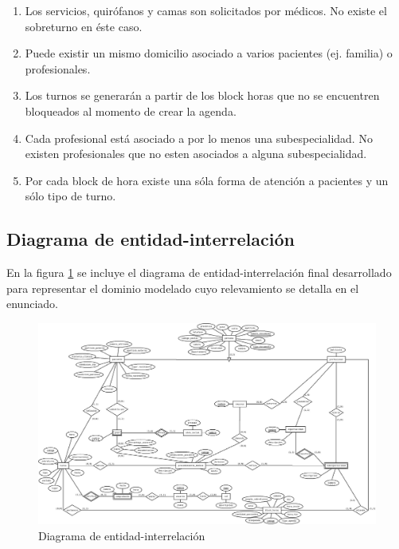 \documentclass[a4paper,11pt]{article}
\begin{document}
\begin{enumerate}
    \item Los servicios, quirófanos y camas son solicitados por médicos. No existe 
    el sobreturno en éste caso.
    
    \item Puede existir un mismo domicilio asociado a varios pacientes (ej. familia)
    o profesionales.
    
    \item Los turnos se generarán a partir de los block horas que no se encuentren 
    bloqueados al momento de crear la agenda.
    
    \item Cada profesional está asociado a por lo menos una subespecialidad. No existen 
    profesionales que no esten asociados a alguna subespecialidad.
    
    \item Por cada block de hora existe una sóla forma de atención a pacientes y un 
    sólo tipo de turno.

\end{enumerate}



\subsection{Diagrama de entidad-interrelación}

 En la figura \ref{fig:der} se incluye el diagrama de entidad-interrelación
 final desarrollado para representar el dominio modelado cuyo relevamiento se
 detalla en el enunciado.

\begin{figure}[h!t]
  \centering
  \includegraphics[width=1.4\textwidth, angle=90]{build/images/der.jpeg}
  \caption{Diagrama de entidad-interrelación} \label{fig:der}
\end{figure}
\end{document}

